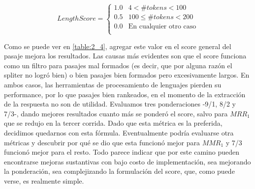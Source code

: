 \begin{equation*}
    LengthScore = \begin{cases}
               1.0     & 4 <   \#tokens < 100\\
               0.5     & 100 \leq \#tokens < 200 \\
               0.0     & \text{En cualquier otro caso}\\
           \end{cases}
\end{equation*}


Como se puede ver en \ref{table:2_4}, agregar este valor en el score general del pasaje mejora los resultados. Las causas más evidentes son que el score funciona como un filtro para pasajes mal formados (es decir, que por alguna razón el spliter no logró  bien) o bien pasajes bien formados pero excesivamente largos. En ambos casos, las herramientas de procesamiento de lenguajes pierden su performance, por lo que pasajes bien rankeados, en el momento de la extracción de la respuesta no son de utilidad. Evaluamos tres ponderaciones -9/1, 8/2 y 7/3-, dando mejores resultados cuanto más se ponderó el score, salvo para $MRR_1$ que se redujo en la tercer corrida. Dado que esta métrica es la preferida, decidimos quedarnos con esta fórmula. Eventualmente podría evaluarse otra métricas y descubrir por qué se dio que esta funcionó mejor para $MMR_1$ y 7/3 funcionó mejor para el resto. Todo parece indicar que por este camino pueden encontrarse mejoras sustantivas con bajo costo de implementación, sea mejorando la ponderación, sea complejizando la formulación del score, que, como puede verse, es realmente simple.





